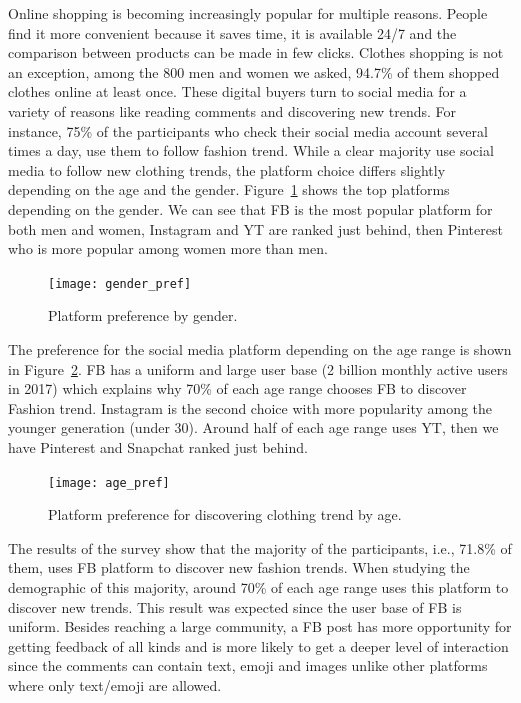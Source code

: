Online shopping is becoming increasingly popular for multiple reasons. People find it more convenient because it saves time, it is available 24/7 and the comparison between products can be made in few clicks.  Clothes shopping is not an exception, among the 800 men and women we asked, 94.7\% of them shopped clothes online at least once. These digital buyers turn to social media for a variety of reasons like reading comments and discovering new trends. For instance, 75\% of the participants who check their social media account several times a day, use them to follow fashion trend.
While a clear majority use social media to follow new clothing trends, the platform choice differs slightly depending on the age and the gender. Figure~\ref{fig:gender_pref} shows the top platforms depending on the gender. We can see that \ac{FB} is the most popular platform for both men and women, Instagram and \ac{YT} are ranked just behind, then Pinterest who is more popular among women more than men. 

\begin{figure}[htb] \centering 
  \texttt{[image: gender\_pref]}
  \caption{Platform preference by gender.}
  \label{fig:gender_pref}
\end{figure}


The preference for the social media platform depending on the age range is shown in Figure~\ref{fig:age_pref}. \ac{FB} has a uniform and large user base (2 billion monthly active users in 2017) which explains why 70\% of each age range chooses \ac{FB} to discover Fashion trend. Instagram is the second choice with more popularity among the younger generation (under 30). Around half of each age range uses \ac{YT}, then we have Pinterest and Snapchat ranked just behind.


\begin{figure}[htb] \centering 
  \texttt{[image: age\_pref]}
  \caption{ Platform preference for discovering clothing trend by age.}
  \label{fig:age_pref}
\end{figure}



The results of the survey show that the majority of the participants, i.e., 71.8\% of them, uses \ac{FB} platform to discover new fashion trends. When studying the demographic of this majority, around 70\% of each age range uses this platform to discover new trends. This result was expected since the user base of \ac{FB} is uniform. Besides reaching a large community, a \ac{FB} post has more opportunity for getting feedback of all kinds and is more likely to get a deeper level of interaction since the comments can contain text, emoji and images unlike other platforms where only text/emoji are allowed. 

